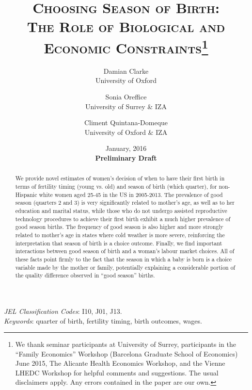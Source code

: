 \documentclass[a4paper, 12 pt]{article}
\theoremstyle{plain}
\begin{document}
\title{\Large{\textsc{Choosing Season of Birth:}}\\ \Large{\textsc{The Role of Biological and Economic Constraints}}\thanks{\scriptsize{We thank seminar participants at University of Surrey, participants in the ``Family Economics'' Workshop (Barcelona Graduate School of Economics) June 2015, The Alicante Health Economics Workshop, and the Vienne LHEDC Workshop for helpful comments and suggestions. The usual disclaimers apply. Any errors contained in the paper are our own.}}}
\author{\small{Damian Clarke} \\ \small{University of Oxford} \and \small{Sonia Oreffice} \\ \small{University of Surrey \& IZA}  \and \small{Climent Quintana-Domeque} \\ \small{University of Oxford \& IZA}}

\date{\small{January, 2016} \\ \vspace{2mm} \small{\textbf{Preliminary Draft}}}




\maketitle
\thispagestyle{empty}

\begin{abstract}
We provide novel estimates of women's decision of when to have their first birth in terms of fertility timing (young vs. old) and season of birth (which quarter), for non-Hispanic white women aged 25-45 in the US in 2005-2013. The prevalence of good season (quarters 2 and 3) is very significantly related to mother's age, as well as to her education and marital status, while those who do not undergo assisted reproductive technology procedures to achieve their first birth exhibit a much higher prevalence of good season births. The frequency of good season is also higher and more strongly related to mother's age in states where cold weather is more severe, reinforcing the interpretation that season of birth is a choice outcome. Finally, we find important interactions between good season of birth and a woman's labour market choices.  All of these facts point firmly to the fact that the season in which a baby is born is a choice variable made by the mother or family, potentially explaining a considerable portion of the quality difference observed in ``good season'' births. 
\end{abstract}
\emph{JEL Classification Codes}: I10, J01, J13.\\
\emph{Keywords}: quarter of birth, fertility timing, birth outcomes, wages.
\end{document}
